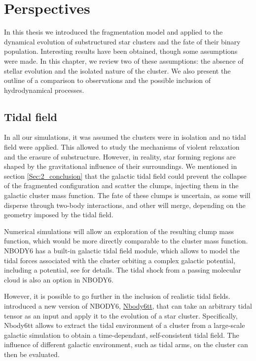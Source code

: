 \chapter{Perspectives}

In this thesis we introduced the \HubLem fragmentation model and applied to the dynamical evolution of substructured star clusters and the fate of their binary population. Interesting results have been obtained, though some assumptions were made. In this chapter, we review two of these assumptions: the absence of stellar evolution and the isolated nature of the cluster. We also present the outline of a comparison to observations and the possible inclusion of hydrodynamical processes.






\section{Tidal field}

In all our simulations, it was assumed the clusters were in isolation and no tidal field were applied. This allowed to study the mechanisms of violent relaxation and the erasure of substructure. However, in reality, star forming regions are shaped by the gravitational influence of their surroundings. We mentioned in section \ref{Sec:2_conclusion} that the galactic tidal field could prevent the collapse of the \HubLem fragmented configuration and scatter the clumps, injecting them in the galactic cluster mass function. The fate of these clumps is uncertain, as some will disperse through two-body interactions, and other will merge, depending on the geometry imposed by the tidal field. 

Numerical simulations will allow an exploration of the resulting clump mass function, which would be more directly comparable to the cluster mass function. NBODY6 has a built-in galactic tidal field module, which allows to model the tidal forces associated with the cluster orbiting a complex galactic potential, including a \cite{Miyamoto1975} potential, see \cite{Aarseth2003} for details. The tidal shock from a passing molecular cloud is also an option in NBODY6.

However, it is possible to go further in the inclusion of realistic tidal fields. \cite{Renaud2011} introduced a new version of NBODY6, \href{http://personal.ph.surrey.ac.uk/~fr0005/nbody6tt.php}{Nbody6tt}, that can take an arbitrary tidal tensor as an input and apply it to the evolution of a star cluster. Specifically, Nbody6tt allows to extract the tidal environment of a cluster from a large-scale galactic simulation to obtain a time-dependant, self-consistent tidal field. The influence of different galactic environment, such as tidal arms, on the cluster can then be evaluated. 


